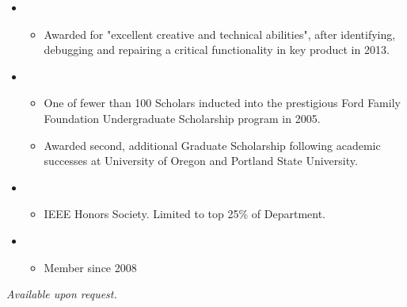 \documentclass{article}
\begin{document}
	\vspace{-15pt}
	\begin{itemize}
		\item {} 	\vspace{-16pt}
		\begin{itemize}
			\item Awarded for "excellent creative and technical abilities", after identifying, debugging and repairing a critical functionality in key product in 2013.
		\end{itemize} \vspace{-6pt}

		\item {} \vspace{-16pt}
		\begin{itemize}
		\item One of fewer than 100 Scholars inducted into the prestigious Ford Family Foundation Undergraduate Scholarship program in 2005. \vspace{-3pt} 
		\item Awarded second, additional Graduate Scholarship following academic successes at University of Oregon and Portland State University. \vspace{-3pt}
		\end{itemize}
		\item {} \vspace{-16pt}
		\begin{itemize}
			\item IEEE Honors Society. Limited to top 25\% of Department. \vspace{-3pt}
		\end{itemize}

		\item {}\vspace{-16pt}
		\begin{itemize}
			\item Member since 2008\vspace{-3pt}
		\end{itemize}

	\end{itemize}

	\emph{Available upon request.}
\end{document}
